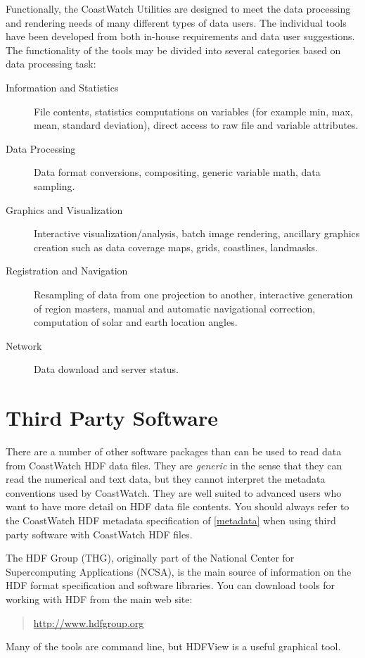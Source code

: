 {Functionally, the CoastWatch Utilities are designed to meet the data
processing and rendering needs of many different types of data users.
The individual tools have been developed from both in-house
requirements and data user suggestions.  The functionality of the
tools may be divided into several categories based on data processing
task:
\begin{description}

  \item[Information and Statistics] File contents, statistics
  computations on variables (for example min, max, mean, standard
  deviation), direct access to raw file and variable attributes.

  \item[Data Processing] Data format conversions,
  compositing, generic variable math, data sampling.

  \item[Graphics and Visualization] Interactive
  visualization/analysis, batch image rendering, ancillary graphics
  creation such as data coverage maps, grids, coastlines, landmasks.
    
  \item[Registration and Navigation] Resampling of data from one
  projection to another, interactive generation of region masters,
  manual and automatic navigational correction, computation of solar
  and earth location angles.

  \item[Network] Data download and server status.

\end{description}

\section{Third Party Software}
\label{third}

There are a number of other software packages than can
be used to read data from CoastWatch HDF data files.  They are {\em
generic} in the sense that they can read the numerical and text data,
but they cannot interpret the metadata conventions used by CoastWatch.
They are well suited to advanced users who want to have more detail on
HDF data file contents.  You should always refer to the CoastWatch
HDF metadata specification of \autoref{metadata} when using third
party software with CoastWatch HDF files.

The HDF Group (THG), originally part of the National Center for
Supercomputing Applications (NCSA), is the main source of information
on the HDF format specification and software libraries.  You can
download tools for working with HDF from the main web site:
\begin{quote}
  \url{http://www.hdfgroup.org}
\end{quote} 
Many of the tools are command line, but HDFView is a useful graphical
tool.

}
